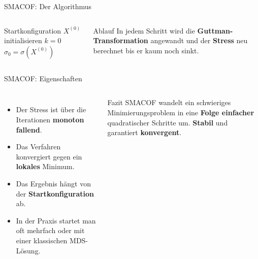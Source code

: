 
\begin{frame}{SMACOF: Der Algorithmus}
\begin{columns}
\footnotesize
{}
\begin{algorithm}[H]
\SetAlgoLined
{}
Startkonfiguration $X^{(0)}$ initialisieren\;
$k = 0$\;
$\sigma_0 = \sigma(X^{(0)})$\;
\caption{SMACOF}
\end{algorithm}

\begin{block}{Ablauf}
In jedem Schritt wird die \textbf{Guttman-Transformation} angewandt und der
\textbf{Stress} neu berechnet bis er kaum noch sinkt.
\end{block}
\end{columns}
\end{frame}

\begin{frame}{SMACOF: Eigenschaften}
\begin{columns}
\begin{itemize}
  \item Der Stress ist über die Iterationen \textbf{monoton fallend}.
  \item Das Verfahren konvergiert gegen ein \textbf{lokales} Minimum.
  \item Das Ergebnis hängt von der \textbf{Startkonfiguration} ab.
  \item In der Praxis startet man oft mehrfach oder mit einer klassischen
        MDS-Lösung.
\end{itemize}

\begin{blockC1}{Fazit}
SMACOF wandelt ein schwieriges Minimierungsproblem in eine \textbf{Folge
einfacher} quadratischer Schritte um. \textbf{Stabil} und garantiert
\textbf{konvergent}.
\end{blockC1}
\end{columns}
\end{frame}

